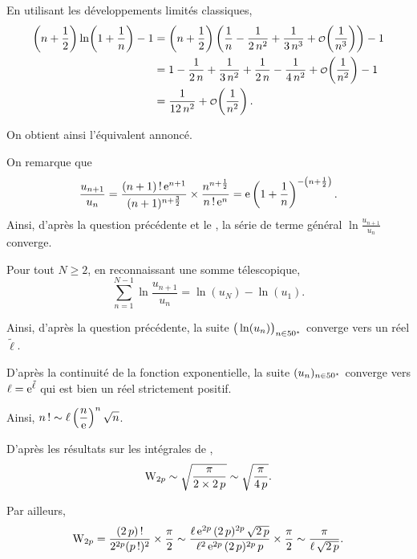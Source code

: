 \begin{solution}
\begin{reponses}
\item En utilisant les développements limités classiques,
\begin{align*}
\left(n + \frac{1}{2}\right) \ln\mathopen{}\left(1 + \frac{1}{n}\right) - 1
&= \left(n + \frac{1}{2}\right) \left(\frac{1}{n} - \frac{1}{2 \, n^2} + \frac{1}{3 \, n^3} + \petito\mathopen{}\left(\frac{1}{n^3}\right)\right) - 1\\
&= 1 - \frac{1}{2 \, n} + \frac{1}{3 \, n^2} + \frac{1}{2 \, n} - \frac{1}{4 \, n^2} + \petito\mathopen{}\left(\frac{1}{n^2}\right) - 1\\
&= \frac{1}{12 \, n^2} + \petito\mathopen{}\left(\frac{1}{n^2}\right).
\end{align*}

On obtient ainsi l'équivalent annoncé.

\item On remarque que
\[
\frac{u_{n+1}}{u_n}
= \frac{(n + 1)\,!\, \mathrm{e}^{n+1}}{(n+1)^{n+\frac{3}{2}}} \times \frac{n^{n+\frac{1}{2}}}{n\,!\, \mathrm{e}^n}
= \mathrm{e} \left(1 + \frac{1}{n}\right)^{-\mathopen{}\left(n + \frac{1}{2}\right)}.
\]
Ainsi, d'après la question précédente et le , la série de terme général $\ln\frac{u_{n+1}}{u_n}$ converge.

\item Pour tout $N \geqslant 2$, en reconnaissant une somme télescopique,
\[
\sum_{n=1}^{N-1} \ln\frac{u_{n+1}}{u_n} = \ln(u_N) - \ln(u_1).
\]

Ainsi, d'après la question précédente, la suite $\big(\ln(u_n)\big)_{n\in50^\star}$ converge vers un réel $\tilde{\ell}$.

D'après la continuité de la fonction exponentielle, la suite $(u_n)_{n\in50^\star}$ converge vers $\ell = \mathrm{e}^{\tilde{\ell}}$ qui est bien un réel strictement positif.

Ainsi, $\displaystyle n\,! \sim \ell \left(\frac{n}{\mathrm{e}}\right)^n \sqrt{n}$.

\item D'après les résultats sur les intégrales de ,
\[
\mathrm{W}_{2p}
\sim \sqrt{\frac{\pi}{2\times 2 \, p}}
\sim \sqrt{\frac{\pi}{4 \, p}}.
\]

Par ailleurs,
\begin{align*}
\mathrm{W}_{2p}
= \frac{(2 \, p)\,!}{2^{2p} (p\,!)^2} \times \frac{\pi}{2}
\sim \frac{\ell\, \mathrm{e}^{2p} \, (2 \, p)^{2p} \, \sqrt{2 \, p}}{\ell^2\, \mathrm{e}^{2p} \, (2 \, p)^{2p} \, p} \times \frac{\pi}{2}
\sim \frac{\pi}{\ell \, \sqrt{2 \, p}}.
\end{align*}


\end{reponses}
\end{solution}

